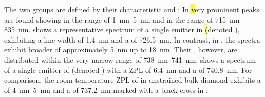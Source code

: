 		The two groups are defined by their characteristic \cwls and \lws:
	In \hl very prominent \ZPL peaks are found showing \lws in the range of \SIrange{1}{5}{nm} and \cwls in the range of \SIrange{715}{835}{nm}.
	 shows a representative spectrum of a single emitter in \hl (denoted \emnarrow), exhibiting a \ZPL line width of \SI{1.4}{nm} and a \cwl of \SI{726.5}{nm}.
	In contrast, in \vl, the spectra exhibit broader \ZPL \lws of approximately \SI{5}{nm} up to \SI{18}{nm}.
	Their \ZPL \cwls, however, are distributed within the very narrow range of \SIrange{738}{741}{nm}.
	 shows a spectrum of a single emitter of \vl (denoted \embroad) with a ZPL \lw of \SI{6.4}{nm} and a \cwl of \SI{740.8}{nm}.
	For comparison, the room temperature ZPL of \sivs in unstrained bulk diamond exhibits a \lw of \SIrange{4}{5}{nm} and a \cwl of \SI{737.2}{nm} marked with a black cross in  \cite{Arend2016a,Dietrich2014}.

